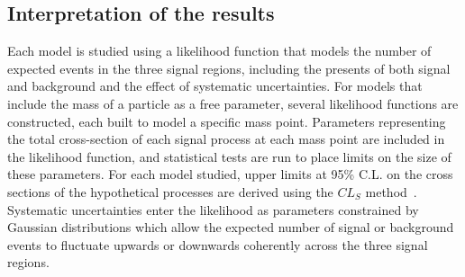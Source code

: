 
\clearpage
\subsection{Interpretation of the results}\label{sect:interpretation}
Each model is studied using a likelihood function that models the number of expected events in the three signal regions, including the presents of both signal and background and the effect of systematic uncertainties.
For models that include the mass of a particle as a free parameter, several likelihood functions are constructed, each built to model a specific mass point.
Parameters representing the total cross-section of each signal process at each mass point are included in the likelihood function, and statistical tests are run to place limits on the size of these parameters.
For each model studied, upper limits at 95\% C.L. on the cross sections of the hypothetical processes are derived using the $CL_S$ method~\cite{Junk:1999kv,0954-3899-28-10-313}.
Systematic uncertainties enter the likelihood as parameters constrained by Gaussian distributions which allow the expected number of signal or background events to fluctuate upwards or downwards coherently across the three signal regions.

